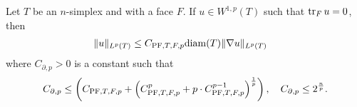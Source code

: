 \documentclass[a4paper]{article}
\begin{document}
\begin{lemma}\label{lemma:mixedbconsimplex}
    Let $T$ be an $n$-simplex and with a face $F$. 
    If $u \in W^{1,p}(T)$ such that $\operatorname{tr}_{F} u = 0$, then 
    \begin{align*}
        \| u \|_{L^{p}(T)}
        &
        \leq 
        C_{{\rm PF},T,F,p} {\operatorname{diam}}(T) \| \nabla u \|_{L^{p}(T)}
    \end{align*}
    where $C_{\partial,p} > 0$ is a constant such that 
    \begin{align*}
        C_{\partial,p}
        \leq 
        \left( C_{{\rm PF},T,F,p} + \left( C_{{\rm PF},T,F,p}^{p} + p \cdot C_{{\rm PF},T,F,p}^{p-1} \right)^{\frac 1 p} \right),  
        \quad 
        C_{\partial,p}
        \leq 
        2^{\frac n p}
        .
    \end{align*}
\end{lemma}
\end{document}
